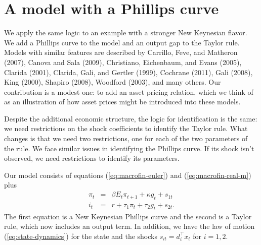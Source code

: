 \documentclass[12pt]{article}
\begin{document}
{\section{A model with a Phillips curve}
\label{sec:phillips-curve}

We apply the same logic to an example with a stronger
New Keynesian flavor.
We add a Phillips curve to the model and an output gap to the Taylor rule.
Models with similar features are described by
Carrillo, Feve, and Matheron (2007),
Canova and Sala (2009),
Christiano, Eichenbaum, and Evans (2005),
Clarida (2001),
Clarida, Gali, and Gertler (1999),
Cochrane (2011),
Gali (2008),
King (2000),
Shapiro (2008),
Woodford (2003), and many others.
Our contribution is a modest one:
to add an asset pricing relation,
which we think of as an illustration of how asset prices
might be introduced into these models.

Despite the additional economic structure,
the logic for identification is the same:
we need restrictions on the shock coefficients
to identify the Taylor rule.
What changes is that we need two restrictions,
one for each of the two parameters of the rule.
We face similar issues in identifying the Phillips curve.
If its shock isn't observed,
we need restrictions to identify its parameters.


Our model consists of equations (\ref{eq:macrofin-euler})
and (\ref{eq:macrofin-real-m}) plus
\begin{eqnarray*}
        \pi_t &=&  \beta E_t \pi_{t+1} + \kappa g_t + s_{1t} \\
    i_t &=& r + \tau_1 \pi_t + \tau_2 g_t + s_{2t}.
\end{eqnarray*}
The first equation is a New Keynesian Phillips curve and
the second is a Taylor rule, which now includes an output term.
In addition, we have
the law of motion (\ref{eq:state-dynamics}) for the state
and the shocks $s_{it} = d_i^\top x_t$ for $i=1,2$.

}
\end{document}
